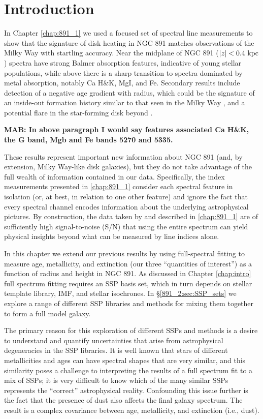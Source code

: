 \section{Introduction}

In Chapter \ref{chap:891_1} we used a focused set of spectral line
measurements to show that the signature of disk heating in NGC 891
matches observations of the Milky Way \citep[e.g.,][]{Bovy12,
  Hayden15} with startling accuracy. Near the midplane of NGC 891
($|z| < 0.4~\mathrm{kpc} $) spectra have strong Balmer absorption
features, indicative of young stellar populations, while above
 there is a sharp transition to spectra dominated by
metal absorption, notably Ca H\&K, MgI, and Fe. Secondary results
include detection of a negative age gradient with radius, which could
be the signature of an inside-out formation history similar to that
seen in the Milky Way \citep{Bovy12, Hayden15}, and a potential flare
in the star-forming disk beyond .

{\bf MAB: In above paragraph I would say features associated Ca H\&K,
  the G band, Mgb and Fe bands 5270 and 5335.}

These results represent important new information about NGC 891 (and,
by extension, Milky Way-like disk galaxies), but they do not take
advantage of the full wealth of information contained in our
data. Specifically, the index measurements presented in
\ref{chap:891_1} consider each spectral feature in isolation
(or, at best, in relation to one other feature) and ignore the fact
that every spectral channel encodes information about the underlying
astrophysical pictures. By construction, the data taken by \GP and
described in \ref{chap:891_1} are of sufficiently high
signal-to-noise (S/N) that using the entire spectrum can yield
physical insights beyond what can be measured by line indices alone.

In this chapter we extend our previous results by using full-spectral
fitting to measure age, metallicity, and extinction (our three
``quantities of interest'') as a function of radius and height in NGC
891. As discussed in Chapter \ref{chap:intro} full spectrum fitting
requires an SSP basis set, which in turn depends on stellar template
library, IMF, and stellar isochrones. In \S\ref{891_2:sec:SSP_sets} we
explore a range of different SSP libraries and methods for mixing them
together to form a full model galaxy.

The primary reason for this exploration of different SSPs and methods
is a desire to understand and quantify uncertainties that arise from
astrophysical degeneracies in the SSP libraries. It is well known
\citep{Oconnel76,Aaronson78,Worthey94,dePaz02} that stars of different
metallicities and ages can have spectral shapes that are very similar,
and this similarity poses a challenge to interpreting the results of a
full spectrum fit to a mix of SSPs; it is very difficult to know which
of the many similar SSPs represents the ``correct'' astrophysical
reality. Confounding this issue further is the fact that the presence
of dust also affects the final galaxy spectrum. The result is a
complex covariance between age, metallicity, and extinction (i.e.,
dust).

